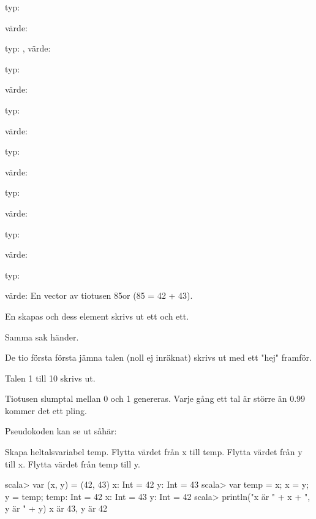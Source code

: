\Subtask typ: 

värde: 

\Subtask typ: , värde: 

\Subtask typ: 

värde: 

\Task 

\Subtask typ: 

värde: 

\Subtask typ: 

värde: 

\Subtask typ: 

värde: 

\Subtask typ: 

värde: 

\Subtask typ: 

värde: En vector av tiotusen 85or (85 = 42 + 43).

\Task 

\Subtask En  skapas och dess element skrivs ut ett och ett.

\Subtask Samma sak händer.

\Subtask De tio första första jämna talen (noll ej inräknat) skrivs ut med ett "hej" framför.

\Subtask Talen 1 till 10 skrivs ut.

\Subtask Tiotusen slumptal mellan 0 och 1 genereras. Varje gång ett tal är större än 0.99 kommer det ett pling.

\Task 

\Subtask Pseudokoden kan se ut såhär:

Skapa heltalsvariabel temp. 
Flytta värdet från x till temp. 
Flytta värdet från y till x. 
Flytta värdet från temp till y.

\Subtask
\begin{REPLnonum}
scala> var (x, y) = (42, 43)
x: Int = 42
y: Int = 43
scala> var temp = x; x = y; y = temp;
temp: Int = 42
x: Int = 43
y: Int = 42
scala> println("x är " + x + ", y är " + y)
x är 43, y är 42
\end{REPLnonum}

